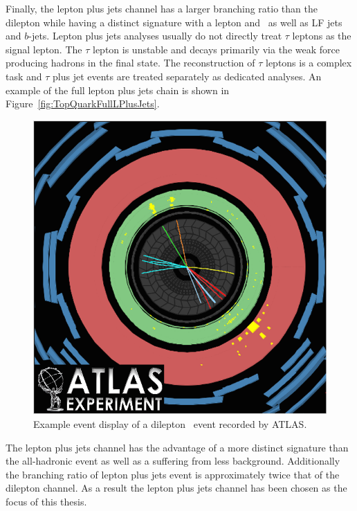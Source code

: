 {Finally, the lepton plus jets channel has a larger branching ratio than the dilepton while having a distinct signature with a lepton and \met\ as well as LF jets and $b$-jets. Lepton plus jets analyses usually do not directly treat $\tau$ leptons as the signal lepton. The $\tau$ lepton is unstable and decays primarily via the weak force producing hadrons in the final state. The reconstruction of $\tau$ leptons is a complex task and $\tau$ plus jet events are treated separately as dedicated analyses. An example of the full lepton plus jets chain is shown in Figure~\ref{fig:TopQuarkFullLPlusJets}.

\begin{figure}[thbp]
  \centering
  \includegraphics[height=0.30\textheight]{PartTopQuark/Diagrams/atlas-2010-063-fig_09.png}
  \caption{Example event display of a dilepton \ttbar\ event recorded by ATLAS.} \label{fig:TopQuarkEventDisplay}
\end{figure}

The lepton plus jets channel has the advantage of a more distinct signature than the all-hadronic event as well as a suffering from less background. Additionally the branching ratio of lepton plus jets event is approximately twice that of the dilepton channel. As a result the lepton plus jets channel has been chosen as the focus of this thesis.

}
